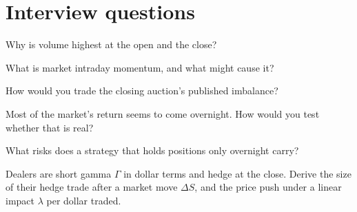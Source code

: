 \section{Interview questions}

\begin{interviewq}\label{iq:s1:intraday-patterns:1}
Why is volume highest at the open and the close?
\end{interviewq}

\begin{interviewq}\label{iq:s1:intraday-patterns:2}
What is market intraday momentum, and what might cause it?
\end{interviewq}

\begin{interviewq}\label{iq:s1:intraday-patterns:3}
How would you trade the closing auction's published imbalance?
\end{interviewq}

\begin{interviewq}\label{iq:s1:intraday-patterns:4}
Most of the market's return seems to come overnight. How would you test whether that is real?
\end{interviewq}

\begin{interviewq}\label{iq:s1:intraday-patterns:5}
What risks does a strategy that holds positions only overnight carry?
\end{interviewq}

\begin{interviewq}\label{iq:s1:intraday-patterns:6}
Dealers are short gamma $\Gamma$ in dollar terms and hedge at the close. Derive the size of their hedge trade after a market move $\Delta S$, and the price push
under a linear impact $\lambda$ per dollar traded.
\end{interviewq}
